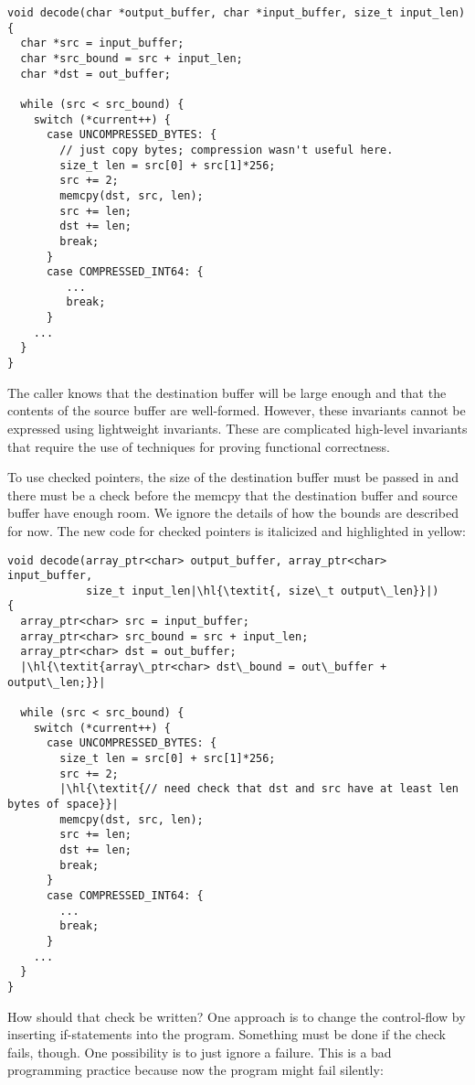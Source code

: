 \begin{lstlisting}
void decode(char *output_buffer, char *input_buffer, size_t input_len)
{
  char *src = input_buffer;
  char *src_bound = src + input_len;
  char *dst = out_buffer;

  while (src < src_bound) {
    switch (*current++) {
      case UNCOMPRESSED_BYTES: {
        // just copy bytes; compression wasn't useful here.
        size_t len = src[0] + src[1]*256;
        src += 2;
        memcpy(dst, src, len);
        src += len;
        dst += len;
        break;
      }
      case COMPRESSED_INT64: {
         ...
         break;
      }
    ...
  }
}
\end{lstlisting}

The caller knows that the destination buffer will be large enough and
that the contents of the source buffer are well-formed. However, these
invariants cannot be expressed using lightweight invariants. These are
complicated high-level invariants that require the use of techniques for
proving functional correctness.

To use checked pointers, the size of the destination buffer must be passed
in and there must be a check before the memcpy that the destination
buffer and source buffer have enough room. We ignore the details of how
the bounds are described for now.    The new code for checked pointers is italicized
and highlighted in yellow:
\begin{lstlisting}[escapechar=\|]
void decode(array_ptr<char> output_buffer, array_ptr<char> input_buffer,
            size_t input_len|\hl{\textit{, size\_t output\_len}}|)
{
  array_ptr<char> src = input_buffer;
  array_ptr<char> src_bound = src + input_len;
  array_ptr<char> dst = out_buffer;
  |\hl{\textit{array\_ptr<char> dst\_bound = out\_buffer + output\_len;}}|

  while (src < src_bound) {
    switch (*current++) {
      case UNCOMPRESSED_BYTES: {
        size_t len = src[0] + src[1]*256;
        src += 2;
        |\hl{\textit{// need check that dst and src have at least len bytes of space}}|
        memcpy(dst, src, len);
        src += len;
        dst += len;
        break;
      }
      case COMPRESSED_INT64: {
        ...
        break;
      }
    ...
  }
}
\end{lstlisting}

How should that check be written? One approach is to change the
control-flow by inserting if-statements into the program. Something must
be done if the check fails, though. One possibility is to just ignore a
failure. This is a bad programming practice because now the program might
fail silently:

